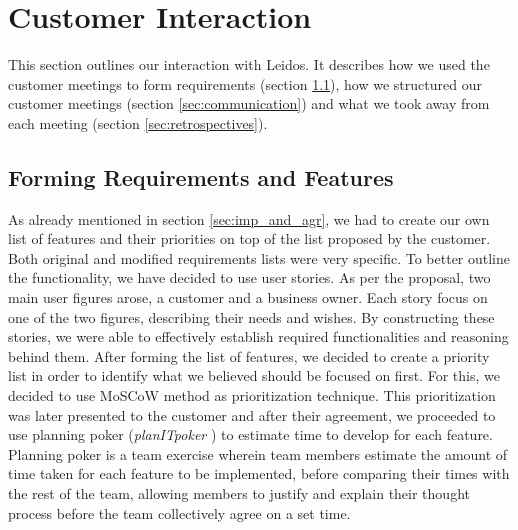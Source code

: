 \documentclass{l3proj}
\begin{document}
\section{Customer Interaction}
\label{sec:customer}
    This section outlines our interaction with Leidos. It describes how we used the customer meetings to form requirements (section \ref{sec:req_and_feat}), how we structured our customer meetings (section \ref{sec:communication}) and what we took away from each meeting (section \ref{sec:retrospectives}).
    
    \subsection{Forming Requirements and Features}
    \label{sec:req_and_feat}
        As already mentioned in section \ref{sec:imp_and_agr}, we had to create our own list of features and their priorities on top of the list proposed by the customer. Both original and modified requirements lists were very specific. To better outline the functionality, we have decided to use user stories. As per the proposal, two main user figures arose, a customer and a business owner. Each story focus on one of the two figures, describing their needs and wishes. By constructing these stories, we were able to effectively establish required functionalities and reasoning behind them.
        \newline
        \newline
        After forming the list of features, we decided to create a priority list in order to identify what we believed should be focused on first. For this, we decided to use MoSCoW \cite{moscow} method as prioritization technique. This prioritization was later presented to the customer and after their agreement, we proceeded to use planning poker (\textit{planITpoker} \cite{poker}) to estimate time to develop for each feature. Planning poker is a team exercise wherein team members estimate the amount of time taken for each feature to be implemented, before comparing their times with the rest of the team, allowing members to justify and explain their thought process before the team collectively agree on a set time.
        \newline
        \newline
\end{document}
